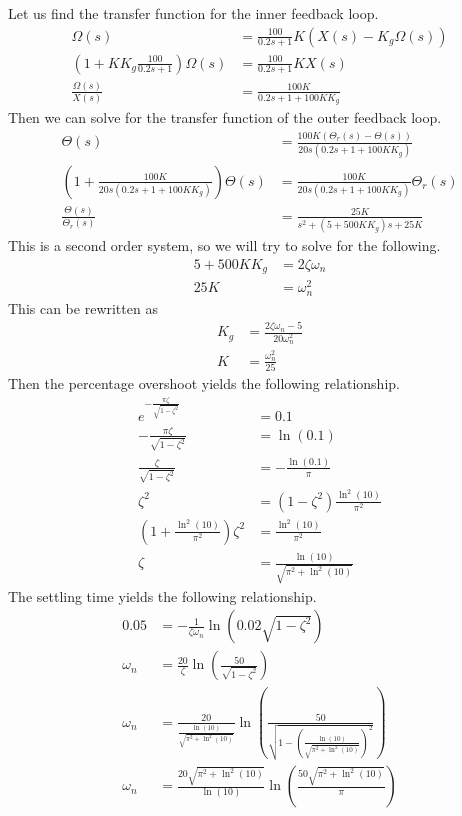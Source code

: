 \documentclass[12pt]{article}
\begin{document}
Let us find the transfer function for the inner feedback loop.
\begin{align*}
    \Omega(s) &= \frac{100}{0.2s+1}K(X(s)-K_g\Omega(s))\\
    \left(1+KK_g\frac{100}{0.2s+1}\right)\Omega(s)&=\frac{100}{0.2s+1}KX(s)\\
    \frac{\Omega(s)}{X(s)}&=\frac{100K}{0.2s+1+100KK_g}
\end{align*}
Then we can solve for the transfer function of the outer feedback loop.
\begin{align*}
    \Theta(s) &= \frac{100K(\Theta_r(s) -\Theta(s))}{20s(0.2s+1+100KK_g)}\\
    \left(1+\frac{100K}{20s(0.2s+1+100KK_g)}\right)\Theta(s)&=\frac{100K}{20s(0.2s+1+100KK_g)}\Theta_r(s)\\
    \frac{\Theta(s)}{\Theta_r(s)}&=\frac{25K}{s^2+(5+500KK_g)s+25K}
\end{align*}
This is a second order system, so we will try to solve for the following.
\begin{align*}
    5+500KK_g&=2\zeta\omega_n\\
    25K&=\omega_n^2
\end{align*}
This can be rewritten as
\begin{align*}
    K_g&=\frac{2\zeta\omega_n-5}{20\omega_n^2}\\
    K&=\frac{\omega_n^2}{25}
\end{align*}
Then the percentage overshoot yields the following relationship.
\begin{align*}
    e^{-\frac{\pi\zeta}{\sqrt{1-\zeta^2}}} &= 0.1\\
    -\frac{\pi\zeta}{\sqrt{1-\zeta^2}} &= \ln(0.1)\\
    \frac{\zeta}{\sqrt{1-\zeta^2}} &= -\frac{\ln(0.1)}{\pi}\\
    \zeta^2 &= (1-\zeta^2)\frac{\ln^2(10)}{\pi^2}\\
    \left(1+\frac{\ln^2(10)}{\pi^2}\right)\zeta^2 &= \frac{\ln^2(10)}{\pi^2}\\
    \zeta &= \frac{\ln(10)}{\sqrt{\pi^2 +\ln^2(10)}}
\end{align*}
The settling time yields the following relationship.
\begin{align*}
    0.05 &= -\frac{1}{\zeta\omega_n}\ln\left(0.02\sqrt{1-\zeta^2}\right)\\
    \omega_n &= \frac{20}{\zeta}\ln\left(\frac{50}{\sqrt{1-\zeta^2}}\right)\\
    \omega_n &= \frac{20}{\frac{\ln(10)}{\sqrt{\pi^2 +\ln^2(10)}}}\ln\left(\frac{50}{\sqrt{1-\left(\frac{\ln(10)}{\sqrt{\pi^2 +\ln^2(10)}}\right)^2}}\right)\\
    \omega_n &= \frac{20\sqrt{\pi^2 +\ln^2(10)}}{\ln(10)} \ln\left(\frac{50\sqrt{\pi^2 +\ln^2(10)}}{\pi}\right)
\end{align*}
\end{document}
